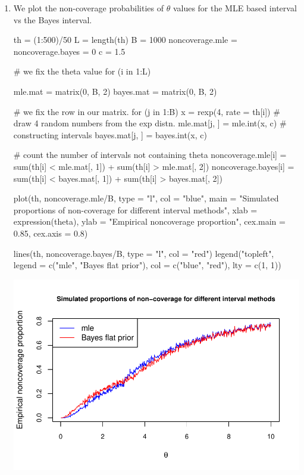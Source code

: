 \documentclass[12pt, a4paper]{article}\usepackage[]{graphicx}\usepackage[]{color}
\makeatletter
\def\maxwidth{ %
  \ifdim\Gin@nat@width>\linewidth
    \linewidth
  \else
    \Gin@nat@width
  \fi
}
\makeatother
\begin{document}
\begin{enumerate}[label={\bfseries\arabic*}]
\begin{enumerate}[label=(\alph*)]
\begin{Schunk}
{}

\end{Schunk}
  \end{enumerate}
\item We plot the non-coverage probabilities of $\theta$ values for the MLE based interval vs the Bayes interval. 
\begin{Schunk}
\begin{Sinput}
th = (1:500)/50
L = length(th)
B = 1000
noncoverage.mle = noncoverage.bayes = 0
c = 1.5

# we fix the theta value
for (i in 1:L) {
    mle.mat = matrix(0, B, 2)
    bayes.mat = matrix(0, B, 2)

    # we fix the row in our matrix.
    for (j in 1:B) {
        x = rexp(4, rate = th[i])  # draw 4 random numbers from the exp distn. 
        mle.mat[j, ] = mle.int(x, c)  # constructing intervals
        bayes.mat[j, ] = bayes.int(x, c)
    }

    # count the number of intervals not containing theta
    noncoverage.mle[i] = sum(th[i] < mle.mat[, 1]) + sum(th[i] > mle.mat[, 2])
    noncoverage.bayes[i] = sum(th[i] < bayes.mat[, 1]) + sum(th[i] > bayes.mat[, 2])
}
plot(th, noncoverage.mle/B, type = "l", col = "blue", main = "Simulated proportions of non-coverage for different interval methods",
    xlab = expression(theta), ylab = "Empirical noncoverage proportion", cex.main = 0.85, cex.axis = 0.8)

lines(th, noncoverage.bayes/B, type = "l", col = "red")
legend("topleft", legend = c("mle", "Bayes flat prior"), col = c("blue", "red"), lty = c(1, 1))
\end{Sinput}


{\centering \includegraphics[width=\maxwidth]{figure/unnamed-chunk-7-1} 

}
\end{Schunk}
\end{enumerate}
\end{document}
